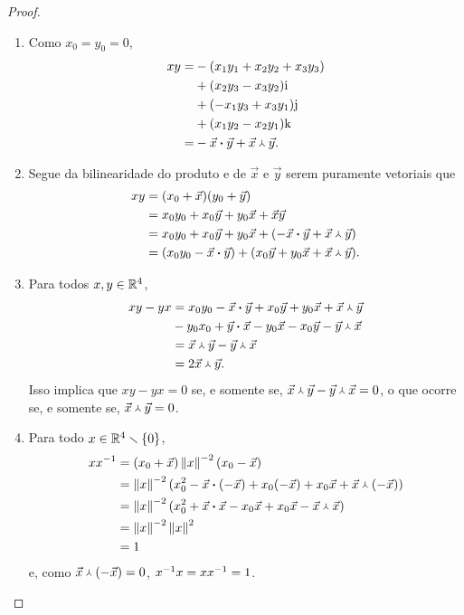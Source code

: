 \begin{proof}
\begin{enumerate}
	\item Como $x_0=y_0=0$,
	\begin{align*}
	xy =& -(x_1y_1 + x_2y_2 + x_3y_3) \\
			&+ (x_2y_3-x_3y_2) \mathrm{i} \\
			&+ (-x_1y_3+x_3y_1) \mathrm{j} \\
			&+ (x_1y_2-x_2y_1) \mathrm{k} \\
		=& - {\vec{x}} \bm{\cdot} {\vec{y}} + {\vec{x}} \Yup {\vec{y}}.
	\end{align*}

	\item Segue da bilinearidade do produto e de $\vec{x}$ e $\vec{y}$ serem puramente vetoriais que
	\begin{align*}
	xy &= ({x}_0+\vec{x})({y}_0+\vec{y}) \\
		&= {x}_0{y}_0+{x}_0\vec{y}+{y}_0\vec{x}+\vec{x}\vec{y} \\
		&= {x}_0{y}_0+{x}_0\vec{y}+{y}_0\vec{x}+(-{\vec{x}} \bm{\cdot} {\vec{y}} + {\vec{x}} \Yup {\vec{y}}) \\
		&= ({x}_0{y}_0 - {\vec{x}} \bm{\cdot} {\vec{y}}) + ({x}_0\vec{y}+{y}_0\vec{x}+{\vec{x}} \Yup {\vec{y}}).
	\end{align*}
	
	\item Para todos $x,y \in \mathbb{R}^4$,
		\begin{align*}
		xy - yx &= {x}_0{y}_0 - {\vec{x}} \bm{\cdot} {\vec{y}}+{x}_0\vec{y}+{y}_0\vec{x}+{\vec{x}} \Yup {\vec{y}} \\
			&- {y}_0{x}_0 + {\vec{y}} \bm{\cdot} {\vec{x}}-{y}_0\vec{x}-{x}_0\vec{y}-{\vec{y}} \Yup {\vec{x}} \\
			&= {\vec{x}} \Yup {\vec{y}} - {\vec{y}} \Yup {\vec{x}} \\
			&= 2{\vec{x}} \Yup {\vec{y}}.
		\end{align*}
Isso implica que $xy-yx=0$ se, e somente se, ${\vec{x}} \Yup {\vec{y}} - {\vec{y}} \Yup {\vec{x}}=0$, o que ocorre se, e somente se, ${\vec{x}} \Yup {\vec{y}}=0$.%

	\item Para todo $x \in \mathbb{R}^4 \smallsetminus \{0\}$,
	\begin{align*}
	xx^{-1} &= ({x}_0+\vec{x})\left\Vert{x}\right\Vert^{-2}({x}_0-\vec{x}) \\
		&= \left\Vert{x}\right\Vert^{-2}({x}_0^2-{\vec{x}} \bm{\cdot} {(-\vec{x})}+{x}_0(-\vec{x})+{x}_0\vec{x}+{\vec{x}} \Yup {(-\vec{x})}) \\
		&= \left\Vert{x}\right\Vert^{-2}({x}_0^2+{\vec{x}} \bm{\cdot} {\vec{x}}-{x}_0\vec{x}+{x}_0\vec{x}-{\vec{x}} \Yup {\vec{x}}) \\
		&= \left\Vert{x}\right\Vert^{-2}\left\Vert{x}\right\Vert^2 \\
		&= 1
	\end{align*}
e, como ${\vec{x}} \Yup {(-\vec{x})} = 0$, $x^{-1} x = xx^{-1} = 1$.


\end{enumerate}
\end{proof}
